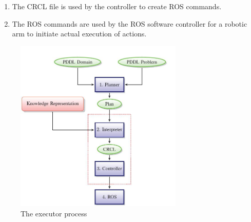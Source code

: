 \begin{enumerate}
\item The CRCL file is used by the controller to create ROS commands.

\item The ROS commands are used by the ROS software controller for a robotic arm to initiate actual execution of actions.

\end{enumerate}

\begin{figure}[ht!]
\begin{center}
\includegraphics[width=8cm]{images/executordiag.jpg}
\caption{The executor process}
\label{fig:executor}
\end{center}
\end{figure}

